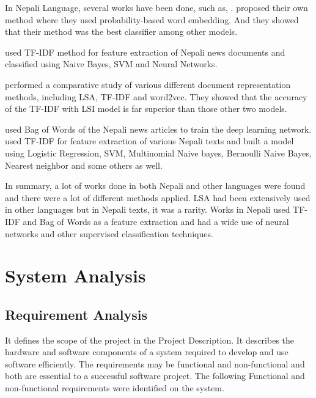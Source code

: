 \documentclass[12pt]{report}
\begin{document}
                        In Nepali Language, several works have been done, such as, 
                        \cite{sitaula2021vector,shahi2018nepali,kafle2016improving,subba2019nepali,singh2018nepali}. \cite{sitaula2021vector} proposed their own method where they used probability-based
                        word embedding. And they showed that their method was the best classifier among other models. 
                        
                        \cite{shahi2018nepali} used TF-IDF method for feature extraction of Nepali news documents and classified using Naive Bayes, SVM and Neural Networks. 

                        \cite{kafle2016improving} performed a comparative study of various different document representation methods, including LSA, TF-IDF and word2vec. They showed that the accuracy
                        of the TF-IDF with LSI model is far superior than those other two models. 

                        \cite{subba2019nepali} used Bag of Words\cite{salton1983introduction} of the Nepali news articles to train the deep learning network. \cite{singh2018nepali} used TF-IDF for 
                        feature extraction of various Nepali texts and built a model using Logistic Regression, SVM, Multinomial Naive bayes, Bernoulli Naive Bayes, Nearest neighbor and some others as well.

                        In summary, a lot of works done in both Nepali and other languages were found and there were a lot of different methods applied. LSA had been extensively used in 
                        other languages but in Nepali texts, it was a rarity. Works in Nepali used TF-IDF and Bag of Words as a feature extraction and had a wide use of neural networks and other 
                        supervised classification techniques. 



            \chapter{System Analysis}

            \section{Requirement Analysis}
            It defines the scope of the project in the Project Description. It describes the hardware and software components of a system required to develop and use software 
            efficiently.
            The requirements may be functional and non-functional and both are essential to a successful software project. 
            The following Functional and non-functional requirements were identified on the system.
\end{document}
